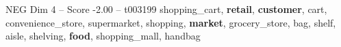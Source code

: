 \begin{textsample}{NEG Dim 4 – Score -2.00 – t003199}  \label{ex:f4_neg_024}
shopping\_cart, \textbf{retail}, \textbf{customer}, cart, convenience\_store, supermarket, shopping, \textbf{market}, grocery\_store, bag, shelf, aisle, shelving, \textbf{food}, shopping\_mall, handbag

\end{textsample}
